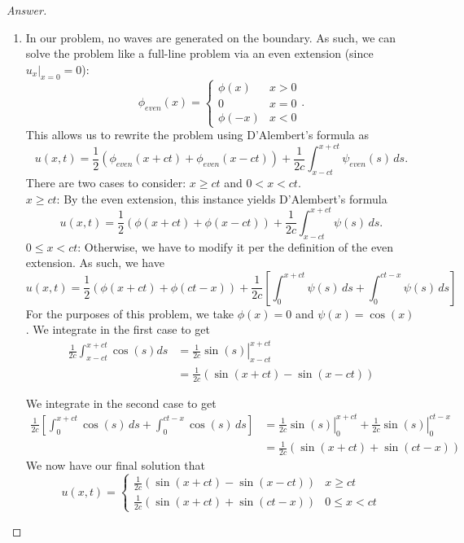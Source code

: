 \documentclass{article}
\theoremstyle{definition}
\renewcommand\qedsymbol{$\blacksquare$}
\newenvironment{ans}{\begin{proof}[Answer]\renewcommand{\qedsymbol}{}}{\end{proof}}
\begin{document}
\begin{ans}
\begin{enumerate}[(1), start=9]
    \item In our problem, no waves are generated on the boundary. As such, we can solve the problem like a full-line problem via an even extension (since $u_x|_{x=0} = 0$):
    \[\phi_{even}(x) = \begin{cases}
        \phi(x) & x > 0\\
        0 & x = 0\\
        \phi(-x) & x < 0
    \end{cases}.\]
    This allows us to rewrite the problem using D'Alembert's formula as
    \[u(x,t) = \frac{1}{2}(\phi_{even}(x+ct) + \phi_{even}(x-ct)) + \frac{1}{2c}\int_{x-ct}^{x+ct}\psi_{even}(s)\,ds.\]
    There are two cases to consider: $x \geq ct$ and $0 < x < ct$.\\
    \underline{$x \geq ct$}: By the even extension, this instance yields D'Alembert's formula
    \[u(x,t) = \frac{1}{2}(\phi(x+ct) + \phi(x-ct)) + \frac{1}{2c}\int_{x-ct}^{x+ct}\psi(s)\,ds.\]
    \underline{$0 \leq x < ct$}: Otherwise, we have to modify it per the definition of the even extension. As such, we have
    \[u(x,t) = \frac{1}{2}(\phi(x+ct) + \phi(ct-x)) + \frac{1}{2c}\left[\int_0^{x+ct}\psi(s)\,ds + \int_0^{ct-x}\psi(s)\,ds\right]\]
    For the purposes of this problem, we take $\phi(x) = 0$ and $\psi(x) = \cos(x)$. We integrate in the first case to get 
    \begin{align*}
        \frac{1}{2c}\int_{x-ct}^{x+ct}\cos(s)ds &= \left.\frac{1}{2c}\sin(s)\right|_{x-ct}^{x+ct}\\
        &=\frac{1}{2c}(\sin(x+ct) - \sin(x-ct))
    \end{align*}

    We integrate in the second case to get
    \begin{align*}
        \frac{1}{2c}\left[\int_0^{x+ct}\cos(s)\,ds + \int_0^{ct-x}\cos(s)\,ds\right]&= \left.\frac{1}{2c}\sin(s)\right|_0^{x+ct} + \left.\frac{1}{2c}\sin(s)\right|_0^{ct-x}\\
        &= \frac{1}{2c}(\sin(x+ct) + \sin(ct-x))
    \end{align*}
    We now have our final solution that
    \[\boxed{u(x,t) = \begin{cases}
       \frac{1}{2c}(\sin(x+ct) - \sin(x-ct)) & x \geq ct\\
        \frac{1}{2c}(\sin(x+ct) + \sin(ct-x)) & 0 \leq x < ct
    \end{cases}}\]


\end{enumerate}
\end{ans}
\end{document}
